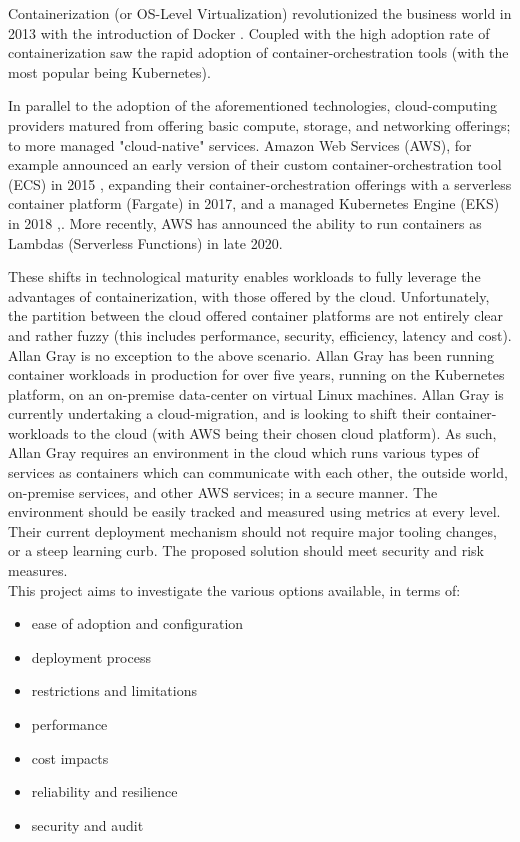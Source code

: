 \documentclass[12pt]{article}
\begin{document}
Containerization (or OS-Level Virtualization) \cite{virtualization} revolutionized the business world in 2013 with the introduction of Docker \cite{docker}. Coupled with the high adoption rate of containerization saw the rapid adoption of container-orchestration tools (with the most popular being Kubernetes\cite{k8s}).

In parallel to the adoption of the aforementioned technologies, cloud-computing providers matured from offering basic compute, storage, and networking offerings; to more managed "cloud-native" services. 
Amazon Web Services (AWS), for example announced an early version of their custom container-orchestration tool (ECS) in 2015 \cite{ecs}, expanding their container-orchestration offerings with a serverless container platform (Fargate) in 2017\cite{fargate}, and a managed Kubernetes Engine (EKS) in 2018 \cite{eks},. More recently, AWS has announced the ability to run containers as Lambdas (Serverless Functions) in late 2020\cite{lambda}.

\noindent These shifts in technological maturity enables workloads to fully leverage the advantages of containerization, with those offered by the cloud. 
Unfortunately, the partition between the cloud offered container platforms are not entirely clear and rather fuzzy (this includes performance, security, efficiency, latency and cost).\\

\noindent Allan Gray is no exception to the above scenario. Allan Gray has been running container workloads in production for over five years, running on the Kubernetes platform, on an on-premise data-center on virtual Linux machines. 
Allan Gray is currently undertaking a cloud-migration, and is looking to shift their container-workloads to the cloud (with AWS being their chosen cloud platform). 
As such, Allan Gray requires an environment in the cloud which runs various types of services as containers which can communicate with each other, the outside world, on-premise services, and other AWS services; in a secure manner. The environment should be easily tracked and measured using metrics at every level. Their current deployment mechanism should not require major tooling changes, or a steep learning curb. The proposed solution should meet security and risk measures.\\

\noindent This project aims to investigate the various options available, in terms of:
\begin{itemize}
    \item ease of adoption and configuration
    \item deployment process
    \item restrictions and limitations 
    \item performance 
    \item cost impacts
    \item reliability and resilience  
    \item security and audit 
\end{itemize}
\end{document}
